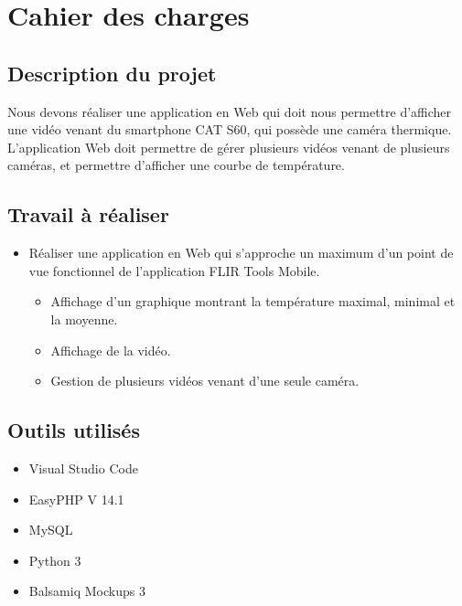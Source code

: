 \documentclass[12pt]{article}
\begin{document}

\setcounter{page}{2}
\tableofcontents
\pagebreak


\section{Cahier des charges}
\subsection{Description du projet}
Nous devons réaliser une application en Web qui doit nous permettre d’afficher une vidéo venant du smartphone CAT S60, qui possède une caméra thermique. L’application Web doit permettre de gérer plusieurs vidéos venant de plusieurs caméras, et permettre d’afficher une courbe de température.
\subsection{Travail à réaliser}
\begin{itemize}
    \item Réaliser une application en Web qui s'approche un maximum d'un point de vue fonctionnel de l'application FLIR Tools Mobile.
    \begin{itemize}
        \item Affichage d’un graphique montrant la température maximal, minimal et la moyenne.
        \item Affichage de la vidéo.
        \item Gestion de plusieurs vidéos venant d’une seule caméra. 
    \end{itemize}
\end{itemize}
\subsection{Outils utilisés}
\begin{itemize}
     \item Visual Studio Code
     \item EasyPHP V 14.1
     \item MySQL
     \item Python 3
     \item Balsamiq Mockups 3
\end{itemize}
\end{document}
